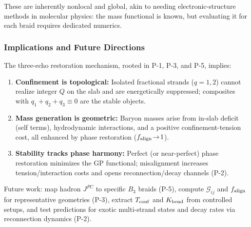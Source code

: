 These are inherently nonlocal and global, akin to needing electronic-structure methods in molecular physics: the mass functional is known, but evaluating it for each braid requires dedicated numerics.

\subsubsection{Implications and Future Directions}

The three-echo restoration mechanism, rooted in P-1, P-3, and P-5, implies:

\begin{enumerate}
\item \textbf{Confinement is topological:} Isolated fractional strands ($q\!=\!1,2$) cannot realize integer $Q$ on the slab and are energetically suppressed; composites with $q_1{+}q_2{+}q_3\!\equiv\!0$ are the stable objects.
\item \textbf{Mass generation is geometric:} Baryon masses arise from in-slab deficit (self terms), hydrodynamic interactions, and a positive confinement-tension cost, all enhanced by phase restoration ($f_{\rm align}\!\to\!1$).
\item \textbf{Stability tracks phase harmony:} Perfect (or near-perfect) phase restoration minimizes the GP functional; misalignment increases tension/interaction costs and opens reconnection/decay channels (P-2).
\end{enumerate}

Future work: map hadron $J^{PC}$ to specific $B_3$ braids (P-5), compute $\mathcal{G}_{ij}$ and $f_{\rm align}$ for representative geometries (P-3), extract $T_{\rm conf}$ and $K_{\rm bend}$ from controlled setups, and test predictions for exotic multi-strand states and decay rates via reconnection dynamics (P-2).

\medskip
{}

